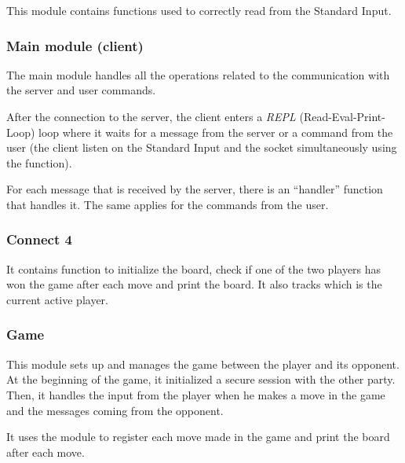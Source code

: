 This module contains functions used to correctly read from the Standard Input.

\subsubsection{Main module (client)}

The main module handles all the operations related to the communication with the
server and user commands.

After the connection to the server, the client enters a \emph{REPL}
(Read-Eval-Print-Loop) loop where it waits for a message from the server or a
command from the user (the client listen on the Standard Input and the socket
simultaneously using the  function).

For each message that is received by the server, there is an ``handler''
function that handles it. The same applies for the commands from the user.

\subsubsection{Connect 4}

It contains function to initialize the board, check if one of the two players
has won the game after each move and print the board. It also tracks which is
the current active player.

\subsubsection{Game}

This module sets up and manages the game between the player and its opponent. At
the beginning of the game, it initialized a secure session with the other party.
Then, it handles the input from the player when he makes a move in the game and
the messages coming from the opponent.

It uses the  module to register each move made in the game and
print the board after each move.
